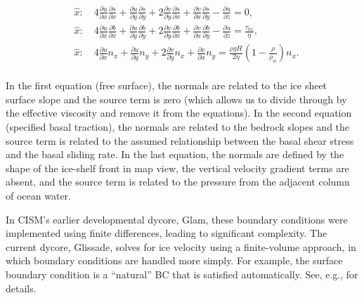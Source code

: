 \begin{equation}
\begin{split}
  & \hat{x}:\quad 4\frac{\partial u}{\partial x}\frac{\partial s}{\partial x}+ \frac{\partial u}{\partial y}\frac{\partial s}{\partial y}+2 \frac{\partial v}{\partial y}\frac{\partial s}{\partial x}+\frac{\partial v}{\partial x}\frac{\partial s}{\partial y}-\frac{\partial u}{\partial z}=0, \\ 
  & \hat{x}:\quad 4\frac{\partial u}{\partial x}\frac{\partial b}{\partial x}+\frac{\partial u}{\partial y}\frac{\partial b}{\partial y}+2\frac{\partial v}{\partial y}\frac{\partial b}{\partial x}+\frac{\partial v}{\partial x}\frac{\partial b}{\partial y}-\frac{\partial u}{\partial z}=\frac{\tau _{bx}}{\eta }, \\ 
  & \hat{x}:\quad 4\frac{\partial u}{\partial x}n_{x}+\frac{\partial u}{\partial y}n_{y}+2\frac{\partial v}{\partial y}n_{x}+\frac{\partial v}{\partial x}n_{y}=\frac{\rho gH}{2\eta }\left( 1-\frac{\rho }{\rho _{w}} \right)n_{x}. \\
\end{split}
\end{equation}

\noindent
In the first equation (free surface), the normals are related to the ice sheet surface slope and the source term is zero (which allows us to divide through by the effective viscosity and remove it from the equations). In the second equation (specified basal traction), the normals are related to the bedrock slopes and the source term is related to the assumed relationship between the basal shear stress and the basal sliding rate. In the last equation, the normals are defined by the shape of the ice-shelf front in map view, the vertical velocity gradient terms are absent, and the source term is related to the pressure from the adjacent column of ocean water.

In CISM's earlier developmental dycore, Glam, these boundary conditions were implemented using finite differences, leading to significant complexity.
The current dycore, Glissade, solves for ice velocity using a finite-volume approach, in which boundary conditions are handled more simply.
For example, the surface boundary condition is a  ``natural'' BC that is satisfied automatically.  See, e.g., \citet{DUKOWICZ:2010wb} for details.
